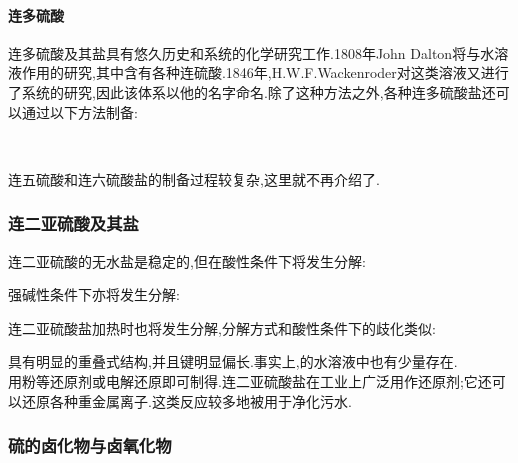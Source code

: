 \documentclass{ctexart}
\begin{document}
\paragraph{连多硫酸}
连多硫酸及其盐具有悠久历史和系统的化学研究工作.1808年John Dalton将与水溶液作用的研究,其中含有各种连硫酸.1846年,H.W.F.Wackenroder对这类溶液又进行了系统的研究,因此该体系以他的名字命名.除了这种方法之外,各种连多硫酸盐还可以通过以下方法制备:
\begin{center}
    \\
\end{center}
连五硫酸和连六硫酸盐的制备过程较复杂,这里就不再介绍了.
\subsubsection{连二亚硫酸及其盐}
连二亚硫酸的无水盐是稳定的,但在酸性条件下将发生分解:
\begin{center}
\end{center}
强碱性条件下亦将发生分解:
\begin{center}
\end{center}
连二亚硫酸盐加热时也将发生分解,分解方式和酸性条件下的歧化类似:
\begin{center}
\end{center}
\indent {}具有明显的重叠式结构,并且键明显偏长.事实上,的水溶液中也有少量存在.\\
\indent 用粉等还原剂或电解还原即可制得.连二亚硫酸盐在工业上广泛用作还原剂;它还可以还原各种重金属离子.这类反应较多地被用于净化污水.
\subsubsection{硫的卤化物与卤氧化物}
\end{document}
